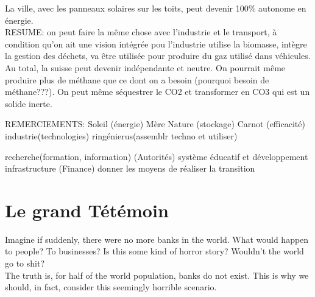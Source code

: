 \documentclass{Article}
\begin{document}
 La ville, avec les panneaux solaires sur les toits, peut devenir 100\% autonome en énergie. \\

 RESUME: on peut faire la même chose avec l'industrie et le transport, à condition qu'on ait une vision intégrée pou l'industrie utilise la biomasse, intègre la gestion des déchets, va être utilisée pour produire du gaz utilisé dans véhicules. Au total, la suisse peut devenir indépendante et neutre. On pourrait même produire plus de méthane que ce dont on a besoin (pourquoi besoin de méthane???). On peut même séquestrer le CO2 et transformer en CO3 qui est un solide inerte.

REMERCIEMENTS:
Soleil (énergie)
Mère Nature (stockage)
Carnot (efficacité)
industrie(technologies)
ringénierus(assemblr techno et utiliser)

recherche(formation, information)
(Autorités) système éducatif et développement infrastructure
(Finance) donner les moyens de réaliser la transition




\section{Le grand Tétémoin}
 Imagine if suddenly, there were no more banks in the world. What would happen to people? To businesses? Is this some kind of horror story? Wouldn't the world go to shit? \\

 The truth is, for half of the world population, banks do not exist. This is why we should, in fact, consider this seemingly horrible scenario. \\
\end{document}
